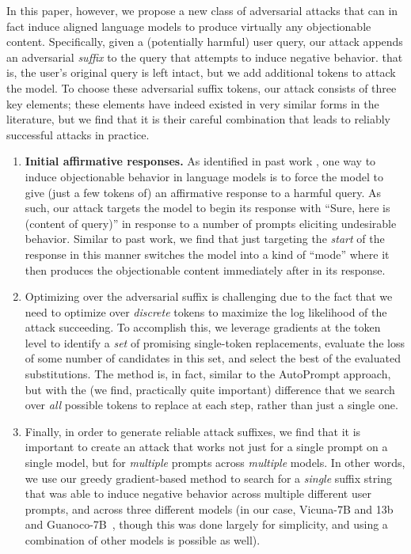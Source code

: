 In this paper, however, we propose a new class of adversarial attacks that can in fact induce aligned language models to produce virtually any objectionable content.  Specifically, given a (potentially harmful) user query, our attack appends an adversarial \emph{suffix} to the query that attempts to induce negative behavior. that is, the user's original query is left intact, but we add additional tokens to attack the model.  To choose these adversarial suffix tokens, our attack consists of three key elements; these elements have indeed existed in very similar forms in the literature, but we find that it is their careful combination that leads to reliably successful attacks in practice.
\begin{enumerate}
    \item \textsf{\textbf{Initial affirmative responses.}} As identified in past work \citep{wei2023jailbroken,carlini2023aligned}, one way to induce objectionable behavior in language models is to force the model to give (just a few tokens of) an affirmative response to a harmful query.  As such, our attack targets the model to begin its response with ``Sure, here is (content of query)'' in response to a number of prompts eliciting undesirable behavior.  Similar to past work, we find that just targeting the \emph{start} of the response in this manner switches the model into a kind of ``mode'' where it then produces the objectionable content immediately after in its response.
    
    \item {} Optimizing over the adversarial suffix is challenging due to the fact that we need to optimize over \emph{discrete} tokens to maximize the log likelihood of the attack succeeding.  To accomplish this, we leverage gradients at the token level to identify a \emph{set} of promising single-token replacements, evaluate the loss of some number of candidates in this set, and select the best of the evaluated substitutions.  The method is, in fact, similar to the AutoPrompt \citep{shin2020autoprompt} approach, but with the (we find, practically quite important) difference that we search over \emph{all} possible tokens to replace at each step, rather than just a single one.

    \item {}  Finally, in order to generate reliable attack suffixes, we find that it is important to create an attack that works not just for a single prompt on a single model, but for \emph{multiple} prompts across \emph{multiple} models.  In other words, we use our greedy gradient-based method to search for a \emph{single} suffix string that was able to induce negative behavior across multiple different user prompts, and across three different models (in our case, Vicuna-7B and 13b~\cite{zheng2023judging} and Guanoco-7B~\cite{dettmers2023qlora}, though this was done largely for simplicity, and using a combination of other models is possible as well).
\end{enumerate}




